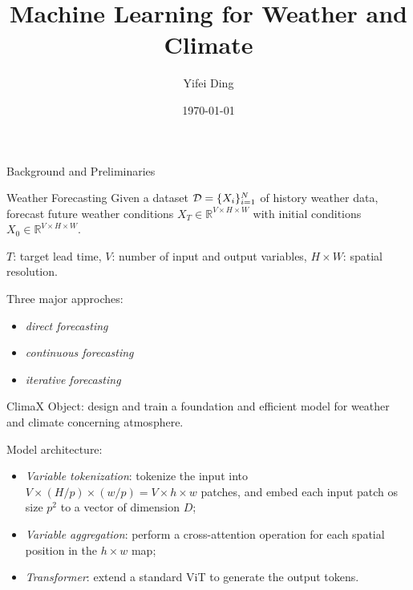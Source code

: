 \documentclass[12pt,aspectratio=169]{beamer}
\title{Machine Learning for Weather and Climate}
\subtitle{}
\author{Yifei Ding}
\date{\today}
\begin{document}
\maketitle

\begin{frame}{Background and Preliminaries}
  \begin{block}{Weather Forecasting}
    Given a dataset ${\cal D}=\{X_i\}_{i=1}^N$ of history weather data, forecast future weather conditions
    $X_T\in\mathbb{R}^{V\times H\times W}$ with initial conditions $X_0\in\mathbb{R}^{V\times H\times W}$.

    $T$: target lead time, $V$: number of input and output variables, $H\times W$: spatial resolution.
  \end{block}

  Three major approches: 
  \begin{itemize}
    \item \textit{\color{ECNURed}direct forecasting}
    \item \textit{\color{ECNURed}continuous forecasting}
    \item \textit{\color{ECNURed}iterative forecasting}
  \end{itemize}
\end{frame}

\begin{frame}{ClimaX}
  Object: design and train a foundation and efficient model for weather and climate concerning atmosphere.

  Model architecture:
  \begin{itemize}
    \item \textit{\color{ECNURed}Variable tokenization}: tokenize the input into 
    $V\times (H/p)\times (w/p)=\allowbreak V\times h\times w$ 
    patches, and embed each input patch os size $p^2$ to a vector of dimension $D$;

    \item \textit{\color{ECNURed}Variable aggregation}: perform a cross-attention operation for each spatial position in the 
    $h\times w$ map;

    \item \textit{\color{ECNURed}Transformer}: extend a standard ViT to generate the output tokens.
  \end{itemize}
\end{frame}
\end{document}
